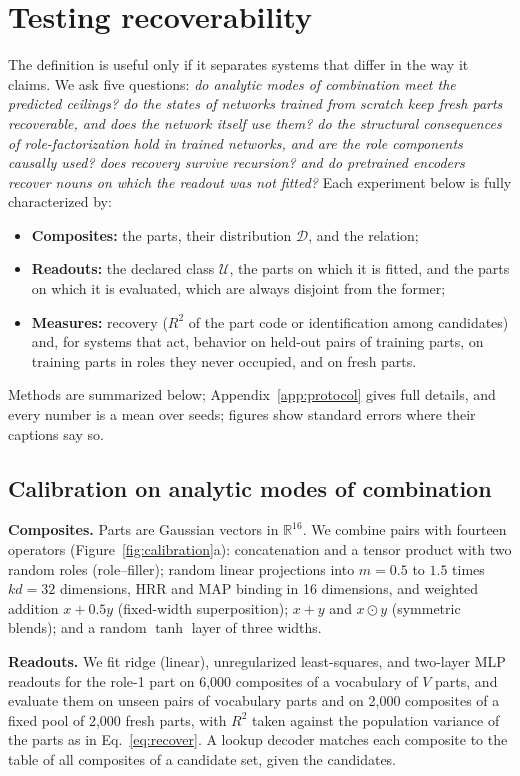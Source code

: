 \documentclass[10pt]{article}
\theoremstyle{plain}
\theoremstyle{remark}
\newcommand{\R}{\mathbb{R}}
\newcommand{\U}{\mathcal{U}}
\newcommand{\D}{\mathcal{D}}
\begin{document}
\section{Testing recoverability}
\label{sec:experiments}

The definition is useful only if it separates systems that differ in the way it claims. We ask five questions: \emph{do analytic modes of combination meet the predicted ceilings? do the states of networks trained from scratch keep fresh parts recoverable, and does the network itself use them? do the structural consequences of role-factorization hold in trained networks, and are the role components causally used? does recovery survive recursion? and do pretrained encoders recover nouns on which the readout was not fitted?} Each experiment below is fully characterized by:
\begin{itemize}
  \item \textbf{Composites:} the parts, their distribution $\D$, and the relation;
  \item \textbf{Readouts:} the declared class $\U$, the parts on which it is fitted, and the parts on which it is evaluated, which are always disjoint from the former;
  \item \textbf{Measures:} recovery ($R^2$ of the part code or identification among candidates) and, for systems that act, behavior on held-out pairs of training parts, on training parts in roles they never occupied, and on fresh parts.
\end{itemize}
Methods are summarized below; Appendix~\ref{app:protocol} gives full details, and every number is a mean over seeds; figures show standard errors where their captions say so.

\subsection{Calibration on analytic modes of combination}
\label{sec:calibration}

\textbf{Composites.} Parts are Gaussian vectors in $\R^{16}$. We combine pairs with fourteen operators (Figure~\ref{fig:calibration}a): concatenation and a tensor product with two random roles (role--filler); random linear projections into $m = 0.5$ to $1.5$ times $kd = 32$ dimensions, HRR and MAP binding in 16 dimensions, and weighted addition $x + 0.5y$ (fixed-width superposition); $x + y$ and $x \odot y$ (symmetric blends); and a random $\tanh$ layer of three widths.

\textbf{Readouts.} We fit ridge (linear), unregularized least-squares, and two-layer MLP readouts for the role-1 part on 6{,}000 composites of a vocabulary of $V$ parts, and evaluate them on unseen pairs of vocabulary parts and on 2{,}000 composites of a fixed pool of 2{,}000 fresh parts, with $R^2$ taken against the population variance of the parts as in Eq.~\eqref{eq:recover}. A lookup decoder matches each composite to the table of all composites of a candidate set, given the candidates.
\end{document}
